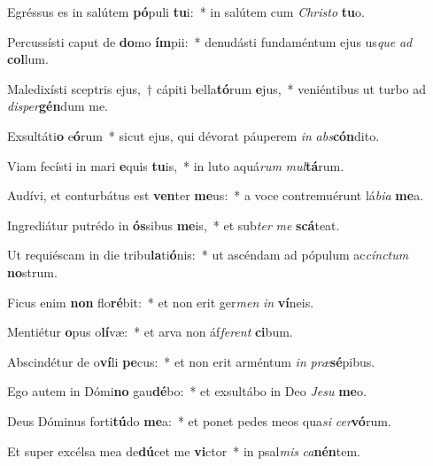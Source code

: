 \item Egréssus es in salútem \textbf{pó}puli \textbf{tu}i:~* in salútem cum \textit{Christo} \textbf{tu}o.
\item Percussísti caput de \textbf{do}mo \textbf{ím}pii:~* denudásti fundaméntum ejus us\textit{que} \textit{ad} \textbf{col}lum.
\item Maledixísti sceptris ejus,~† cápiti bella\textbf{tó}rum \textbf{e}jus,~* veniéntibus ut turbo ad \textit{disper}\textbf{gén}dum me.
\item Exsultáti\textbf{o} e\textbf{ó}rum~* sicut ejus, qui dévorat páuperem \textit{in} \textit{abs}\textbf{cón}dito.
\item Viam fecísti in mari \textbf{e}quis \textbf{tu}is,~* in luto aquá\textit{rum} \textit{mul}\textbf{tá}rum.
\item Audívi, et conturbátus est \textbf{ven}ter \textbf{me}us:~* a voce contremuérunt lá\textit{bia} \textbf{me}a.
\item Ingrediátur putrédo in \textbf{ós}sibus \textbf{me}is,~* et sub\textit{ter} \textit{me} \textbf{scá}teat.
\item Ut requiéscam in die tribu\textbf{la}ti\textbf{ó}nis:~* ut ascéndam ad pópulum ac\textit{cínctum} \textbf{no}strum.
\item Ficus enim \textbf{non} flo\textbf{ré}bit:~* et non erit ger\textit{men} \textit{in} \textbf{ví}neis.
\item Mentiétur \textbf{o}pus o\textbf{lí}væ:~* et arva non áf\textit{ferent} \textbf{ci}bum.
\item Abscindétur de o\textbf{ví}li \textbf{pe}cus:~* et non erit arméntum \textit{in} \textit{præ}\textbf{sé}pibus.
\item Ego autem in Dómi\textbf{no} gau\textbf{dé}bo:~* et exsultábo in Deo \textit{Jesu} \textbf{me}o.
\item Deus Dóminus forti\textbf{tú}do \textbf{me}a:~* et ponet pedes meos qua\textit{si} \textit{cer}\textbf{vó}rum.
\item Et super excélsa mea de\textbf{dú}cet me \textbf{vi}ctor~* in psal\textit{mis} \textit{ca}\textbf{nén}tem.
